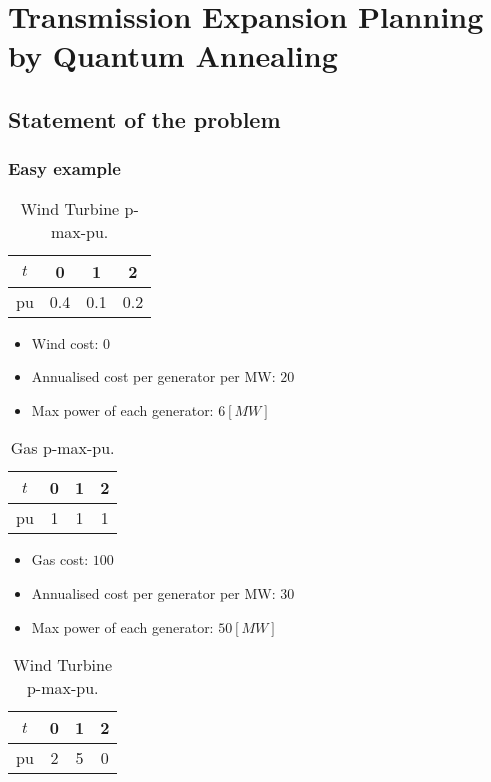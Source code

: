 
\chapter{Transmission Expansion Planning by Quantum Annealing} %

\label{Chapter4} %


\section{Statement of the problem}
\subsection{Easy example}
\begin{table}[h]
\label{tab:wind_turbine}
\centering
\begin{tabular}{ c | c | c | c }
  \hline			
  $t$ & 0 & 1 & 2 \\
    \hline		
  pu & 0.4 & 0.1 & 0.2 \\
  \hline  
\end{tabular}
\caption{Wind Turbine p-max-pu.}
\end{table}
\begin{itemize}
    \item Wind cost: $0$ 
    \item Annualised cost per generator per MW: $20$
    \item Max power of each generator: $6[MW]$
\end{itemize}
\begin{table}[h]
\label{tab:gas}
\centering
\begin{tabular}{ c | c | c | c }
  \hline			
  $t$ & 0 & 1 & 2 \\
    \hline		
  pu & 1 & 1 & 1 \\
  \hline  
\end{tabular}
\caption{Gas p-max-pu.}
\end{table}
\begin{itemize}
    \item Gas cost: $100$ 
    \item Annualised cost per generator per MW: $30$
    \item Max power of each generator: $50[MW]$
\end{itemize}
\begin{table}[h]
\label{tab:load}
\centering
\begin{tabular}{ c | c | c | c }
  \hline			
  $t$ & 0 & 1 & 2 \\
    \hline		
  pu & 2 & 5 & 0 \\
  \hline  
\end{tabular}
\caption{Wind Turbine p-max-pu.}
\end{table}
